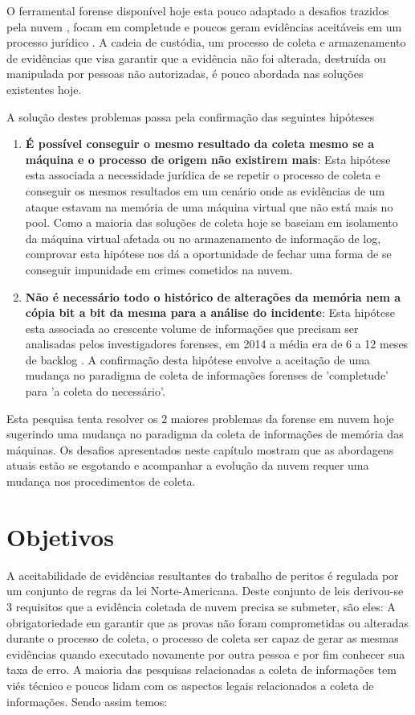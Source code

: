 \documentclass[12pt,				%
	openright,			%
	oneside,			%
	a4paper,			%
	english,			%
	brazil				%
	]{abntex2}
\begin{document}
O ferramental forense disponível hoje esta pouco adaptado a desafios trazidos pela nuvem \cite{Dykstra2012a}, focam em completude e poucos geram evidências aceitáveis em um 
processo jurídico \cite{Reichert2015}. A cadeia de custódia, um processo de coleta e armazenamento de evidências que visa garantir que a evidência não foi alterada, destruída 
ou manipulada por pessoas não autorizadas, é pouco abordada nas soluções existentes hoje. 

A solução destes problemas passa pela confirmação das seguintes hipóteses

\begin{enumerate}
 \item \textbf{É possível conseguir o mesmo resultado da coleta mesmo se a máquina e o processo de origem não existirem mais}: Esta hipótese esta associada a necessidade jurídica de se 
 repetir o processo de coleta e conseguir os mesmos resultados em um cenário onde as evidências de um ataque estavam na memória de uma máquina virtual que não está mais no pool.
 Como a maioria das soluções de coleta hoje se baseiam em isolamento da máquina virtual afetada ou no armazenamento de informação de log, comprovar esta hipótese nos dá
 a oportunidade de fechar uma forma de se conseguir impunidade em crimes cometidos na nuvem.
 \item \textbf{Não é necessário todo o histórico de alterações da memória nem a cópia bit a bit da mesma para a análise do incidente}: Esta hipótese esta associada ao crescente
 volume de informações que precisam ser analisadas pelos investigadores forenses, em 2014 a média era de 6 a 12 meses de backlog \cite{Quick2014}. A confirmação desta hipótese
 envolve a aceitação de uma mudança no paradigma de coleta de informações forenses de 'completude' para 'a coleta do necessário'.
\end{enumerate}

Esta pesquisa tenta resolver os 2 maiores problemas da forense em nuvem hoje sugerindo uma mudança no paradigma da coleta de informações de memória das máquinas. Os desafios apresentados
neste capítulo mostram que as abordagens atuais estão se esgotando e acompanhar a evolução da nuvem requer uma mudança nos procedimentos de coleta.

\chapter{Objetivos} \label{chap:obj}
A aceitabilidade de evidências resultantes do trabalho de peritos é regulada por um conjunto de regras da lei Norte-Americana. Deste conjunto de leis derivou-se 3 requisitos que
a evidência coletada de nuvem precisa se submeter, são eles: A obrigatoriedade em garantir que as provas não foram comprometidas ou alteradas durante o processo de coleta, o processo
de coleta ser capaz de gerar as mesmas evidências quando executado novamente por outra pessoa e por fim conhecer sua taxa de erro. A maioria das pesquisas relacionadas a coleta de 
informações tem viés técnico e poucos lidam com os aspectos legais relacionados a coleta de informações. Sendo assim temos:
\end{document}
